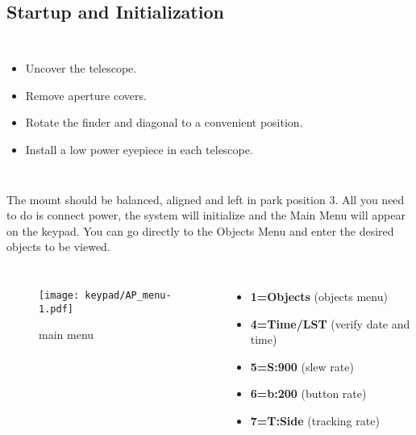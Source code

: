 \subsection{Startup and Initialization}

\begin{frame}[t]{\insertsubsectionhead}
  \begin{columns}[T]
    \centering
      \Large
      \begin{itemize}
        \item Uncover the telescope.
        \item Remove aperture covers.
        \item Rotate the finder and diagonal to a convenient position.
        \item Install a low power eyepiece in each telescope.
      \end{itemize}
  \end{columns}
  \end{frame}


\begin{frame}[t]{\insertsubsectionhead}
    The mount should be balanced, aligned and left in park position 3. All you
    need to do is connect power, the system will initialize and the Main Menu
    will appear on the keypad. You can go directly to the Objects Menu and
    enter the desired objects to be viewed.
  \begin{columns}[T]
      \begin{figure}[h]
          \texttt{[image: keypad/AP\_menu-1.pdf]}
        \caption{main menu}
      \end{figure}
      \begin{itemize}
          \item[] \textbf{1=Objects} (objects menu)
          \item[] \textbf{4=Time/LST} (verify date and time)
          \item[] \textbf{5=S:900}   (slew rate)
          \item[] \textbf{6=b:200}   (button rate)
          \item[] \textbf{7=T:Side}  (tracking rate)
      \end{itemize}
  \end{columns}
\end{frame}

